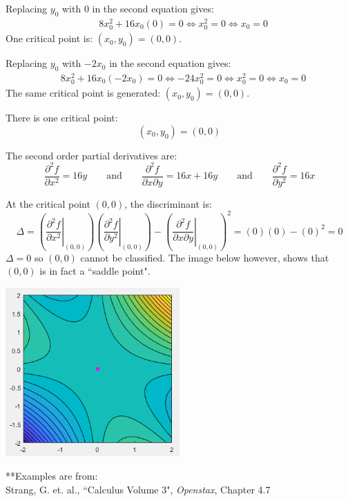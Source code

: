 \documentclass{article}
\begin{document}
\begin{itemize}
Replacing \(y_0\) with \(0\) in the second equation gives:
\begin{align*} 
& 8x_0^2 + 16x_0(0) = 0 
\iff x_0^2 = 0 
\iff x_0 = 0
\end{align*}  
One critical point is: \((x_0, y_0) = (0, 0)\). 

Replacing \(y_0\) with \(-2x_0\) in the second equation gives:
\begin{align*} 
& 8x_0^2 + 16x_0(-2x_0) = 0 
\iff -24x_0^2 = 0 
\iff x_0^2 = 0
\iff x_0 = 0
\end{align*}  
The same critical point is generated: \((x_0, y_0) = (0, 0)\).

There is one critical point:
\[(x_0, y_0) = (0, 0)\]

The second order partial derivatives are:
\[\frac{\partial^2 f}{\partial x^2} = 16y \quad\quad\text{and}\quad\quad \frac{\partial^2 f}{\partial x \partial y} = 16x + 16y \quad\quad\text{and}\quad\quad \frac{\partial^2 f}{\partial y^2} = 16x\]

At the critical point \((0, 0)\), the discriminant is:
\[\Delta = \left(\left.\frac{\partial^2 f}{\partial x^2}\right|_{(0,0)}\right)\left(\left.\frac{\partial^2 f}{\partial y^2}\right|_{(0,0)}\right) - \left(\left.\frac{\partial^2 f}{\partial x \partial y}\right|_{(0,0)}\right)^2 = (0)(0) - (0)^2 = 0\]
\(\Delta = 0\) so \((0, 0)\) cannot be classified. The image below however, shows that \((0, 0)\) is in fact a ``saddle point". 

\begin{center}
\includegraphics[width = 0.5\textwidth]{critical_points_4.png}
\end{center}

\end{itemize}
**Examples are from: \\
Strang, G. et. al., ``Calculus Volume 3", \emph{Openstax}, Chapter 4.7 
\end{document}
